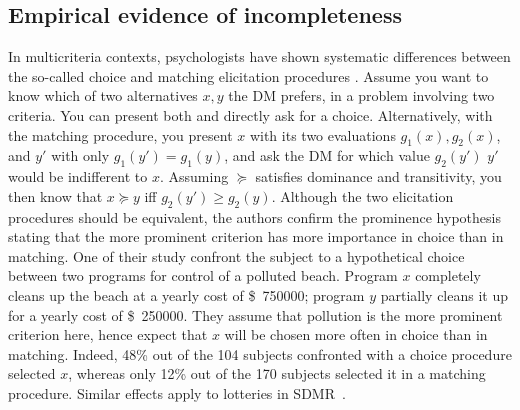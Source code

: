 \documentclass[version=last, pagesize, twocolumn, twoside=off, bibliography=totoc, 12pt, a4paper, english]{scrartcl}
\newcommand{\dollars}[1]{\SI{#1}[\$]{}}
\begin{document}
\subsection{Empirical evidence of incompleteness}
\label{sec:evidence}
In multicriteria contexts, psychologists have shown systematic differences between the so-called choice and matching elicitation procedures \citep{tversky_contingent_1988}. Assume you want to know which of two alternatives $x, y$ the \ac{DM} prefers, in a problem involving two criteria. You can present both and directly ask for a choice. Alternatively, with the matching procedure, you present $x$ with its two evaluations $g_1(x), g_2(x)$, and $y'$ with only $g_1(y') = g_1(y)$, and ask the \ac{DM} for which value $g_2(y')$ $y'$ would be indifferent to $x$. Assuming $\succeq$ satisfies dominance and transitivity, you then know that $x \succeq y$ iff $g_2(y') ≥ g_2(y)$. Although the two elicitation procedures should be equivalent, the authors confirm the prominence hypothesis stating that the more prominent criterion has more importance in choice than in matching. One of their study confront the subject to a hypothetical choice between two programs for control of a polluted beach. Program $x$ completely cleans up the beach at a yearly cost of \dollars{750 000}; program $y$ partially cleans it up for a yearly cost of \dollars{250 000}. They assume that pollution is the more prominent criterion here, hence expect that $x$ will be chosen more often in choice than in matching. Indeed, 48\% out of the 104 subjects confronted with a choice procedure selected $x$, whereas only 12\% out of the 170 subjects selected it in a matching procedure. Similar effects apply to lotteries in SDMR~\citep{luce_utility_2000}.
	
	
\end{document}
